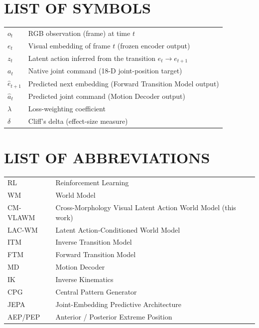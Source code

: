 \documentclass[12pt,a4paper,oneside]{report}
\begin{document}
\chapter*{LIST OF SYMBOLS}\thispagestyle{fancy}
\noindent
\begin{tabular}{ll}
$o_t$        & RGB observation (frame) at time $t$\\
$e_t$        & Visual embedding of frame $t$ (frozen encoder output)\\
$z_t$        & Latent action inferred from the transition $e_t \to e_{t+1}$\\
$a_t$        & Native joint command (18-D joint-position target)\\
$\hat{e}_{t+1}$ & Predicted next embedding (Forward Transition Model output)\\
$\hat{a}_t$  & Predicted joint command (Motion Decoder output)\\
$\lambda$    & Loss-weighting coefficient\\
$\delta$     & Cliff's delta (effect-size measure)\\
\end{tabular}

\chapter*{LIST OF ABBREVIATIONS}\thispagestyle{fancy}
\noindent
\begin{tabular}{ll}
RL      & Reinforcement Learning\\
WM      & World Model\\
CM-VLAWM & Cross-Morphology Visual Latent Action World Model (this work)\\
LAC-WM  & Latent Action-Conditioned World Model\\
ITM     & Inverse Transition Model\\
FTM     & Forward Transition Model\\
MD      & Motion Decoder\\
IK      & Inverse Kinematics\\
CPG     & Central Pattern Generator\\
JEPA    & Joint-Embedding Predictive Architecture\\
AEP/PEP & Anterior / Posterior Extreme Position\\
\end{tabular}
\end{document}
